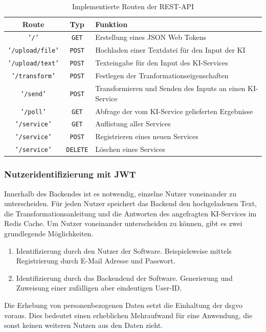 \begin{table}[H]
\centering
\begin{tabular}{c|c|l}
\textbf{Route} & \textbf{Typ} & \textbf{Funktion}\\
\hline
\texttt{'/'} & \texttt{GET} & Erstellung eines JSON Web Tokens\\
\hline
\texttt{'/upload/file'}  & \texttt{POST} & Hochladen einer Textdatei für den Input der KI \\
\texttt{'/upload/text'}  & \texttt{POST} & Texteingabe für den Input des KI-Services \\    
\texttt{'/transform'}  & \texttt{POST} & Festlegen der Tranformationseigenschaften\\ 
\texttt{'/send'}  & \texttt{POST} & Transformieren und Senden des Inputs an einen KI-Service \\ 
\texttt{'/poll'}  & \texttt{GET} & Abfrage der vom KI-Service gelieferten Ergebnisse \\ 
\hline
\texttt{'/service'}  & \texttt{GET} & Auflistung aller Services \\
\texttt{'/service'}  & \texttt{POST} & Registrieren eines neuen Services \\ 
\texttt{'/service'}  & \texttt{DELETE} & Löschen eines Services \\       
\end{tabular}
\caption{Implementierte Routen der REST-API}
\end{table}

\subsubsection{Nutzeridentifizierung mit JWT}
Innerhalb des Backendes ist es notwendig, einzelne Nutzer voneinander zu unterscheiden. Für jeden Nutzer speichert das Backend den hochgeladenen Text, die Transformationsanleitung und die Antworten des angefragten KI-Services im Redis Cache. Um Nutzer voneinander unterscheiden zu können, gibt es zwei grundlegende Möglichkeiten. 
\begin{enumerate}
\item Identifizierung durch den Nutzer der Software. Beispielsweise mittels Registrierung durch E-Mail Adresse und Passwort.
\item Identifizierung durch das Backendend der Software. Generierung und Zuweisung einer zufälligen aber eindeutigen User-ID.
\end{enumerate}

Die Erhebung von personenbezogenen Daten setzt die Einhaltung der \ac{dsgvo} voraus. Dies bedeutet einen erheblichen Mehraufwand für eine Anwendung, die sonst keinen weiteren Nutzen aus den Daten zieht.

